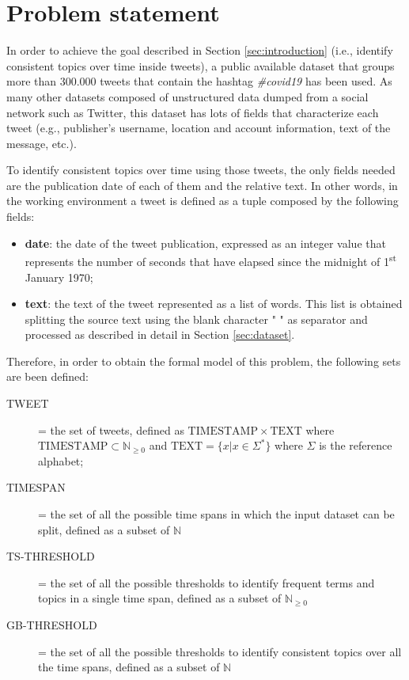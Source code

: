 \section{Problem statement}
\label{sec:problem_statement}
In order to achieve the goal described in Section \ref{sec:introduction} (i.e., identify consistent topics over time inside tweets), a public available dataset that groups more than 300.000 tweets that contain the hashtag \textit{\#covid19} \cite{covid19-tweets-dataset} has been used. As many other datasets composed of unstructured data dumped from a social network such as Twitter, this dataset has lots of fields that characterize each tweet (e.g., publisher's username, location and account information, text of the message, etc.). 

To identify consistent topics over time using those tweets, the only fields needed are the publication date of each of them and the relative text. In other words, in the working environment a tweet is defined as a tuple composed by the following fields:
\begin{itemize}
	\item \textbf{date}: the date of the tweet publication, expressed as an integer value that represents the number of seconds that have elapsed since the midnight of 1\textsuperscript{st} January 1970;
	\item \textbf{text}: the text of the tweet represented as a list of words. This list is obtained splitting the source text using the blank character " " as separator and processed as described in detail in Section \ref{sec:dataset}.
\end{itemize}

Therefore, in order to obtain the formal model of this problem, the following sets are been defined:
\begin{description}
	\item[TWEET] = the set of tweets, defined as $\mathrm{TIMESTAMP} \times \mathrm{TEXT}$ where $\mathrm{TIMESTAMP} \subset \mathbb{N}_{\geq 0}$ and $\mathrm{TEXT} = \{x | x \in \Sigma^*\}$ where $\Sigma$ is the reference alphabet;
	\item[TIMESPAN] = the set of all the possible time spans in which the input dataset can be split, defined as a subset of $\mathbb{N}$
	\item[TS-THRESHOLD] = the set of all the possible thresholds to identify frequent terms and topics in a single time span, defined as a subset of $\mathbb{N}_{\geq 0}$
	\item[GB-THRESHOLD] = the set of all the possible thresholds to identify consistent topics over all the time spans, defined as a subset of $\mathbb{N}$
\end{description}

